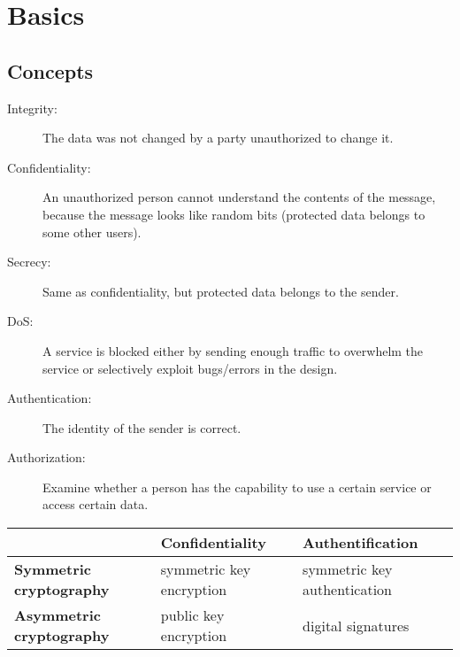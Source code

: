 
\section{Basics}
\subsection{Concepts}
\begin{description}
  \item[Integrity:] The data was not changed by a party unauthorized to change
    it.
  \item[Confidentiality:] An unauthorized person cannot understand the contents of the
    message, because the message looks like random bits (protected data belongs to
    some other users).
  \item[Secrecy:] Same as confidentiality, but protected data belongs to the
    sender.
  \item[DoS:] A service is blocked either by sending enough traffic to overwhelm the service
    or selectively exploit bugs/errors in the design.
  \item[Authentication:] The identity of the sender is correct.
  \item[Authorization:] Examine whether a person has the capability to use
    a certain service or access certain data.
\end{description}

\begin{tabular}{p{2.2cm}p{2.5cm}p{2.5cm}}
  \hline
	& 	\textbf{Confidentiality} & \textbf{Authentification}\\
	\hline
	\hline
  \textbf{Symmetric cryptography} & symmetric key encryption & symmetric
  key authentication\\
  \hline
  \textbf{Asymmetric cryptography} & public key encryption & digital signatures\\
  \hline
\end{tabular}
